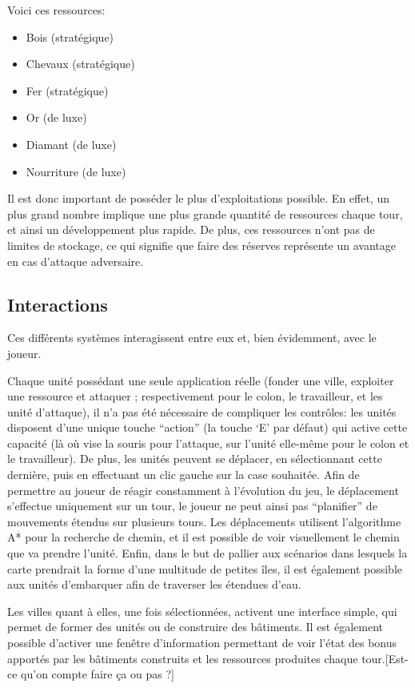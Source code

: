 \documentclass[12pt]{report}
\begin{document}
Voici ces ressources:

\begin{itemize}
    \item Bois (stratégique)
    \item Chevaux (stratégique)
    \item Fer (stratégique)
    \item Or (de luxe)
    \item Diamant (de luxe)
    \item Nourriture (de luxe)
\end{itemize}

Il est donc important de posséder le plus d’exploitations possible. En effet, un
plus grand nombre implique une plus grande quantité de ressources chaque tour,
et ainsi un développement plus rapide. De plus, ces ressources n’ont pas de
limites de stockage, ce qui signifie que faire des réserves représente un
avantage en cas d’attaque adversaire.

\subsection{Interactions}

Ces différents systèmes interagissent entre eux et, bien évidemment, avec le
joueur. 

Chaque unité possédant une seule application réelle (fonder une ville, exploiter
une ressource et attaquer ; respectivement pour le colon, le travailleur, et les
unité d’attaque), il n’a pas été nécessaire de compliquer les contrôles: les
unités disposent d’une unique touche “action” (la touche ‘E’ par défaut) qui
active cette capacité (là où vise la souris pour l’attaque, sur l’unité
elle-même pour le colon et le travailleur). De plus, les unités peuvent se
déplacer, en sélectionnant cette dernière, puis en effectuant un clic gauche sur
la case souhaitée. Afin de permettre au joueur de réagir constamment à
l’évolution du jeu, le déplacement s’effectue uniquement sur un tour, le joueur
ne peut ainsi pas “planifier” de mouvements étendus sur plusieurs tours. Les
déplacements utilisent l’algorithme A* pour la recherche de chemin, et il est
possible de voir visuellement le chemin que va prendre l’unité. Enfin, dans le
but de pallier aux scénarios dans lesquels la carte prendrait la forme d’une
multitude de petites îles, il est également possible aux unités d’embarquer afin
de traverser les étendues d’eau.

Les villes quant à elles, une fois sélectionnées, activent une interface simple,
qui permet de former des unités ou de construire des bâtiments. Il est également
possible d’activer une fenêtre d’information permettant de voir l’état des bonus
apportés par les bâtiments construits et les ressources produites chaque
tour.[Est-ce qu’on compte faire ça ou pas ?]
\end{document}
